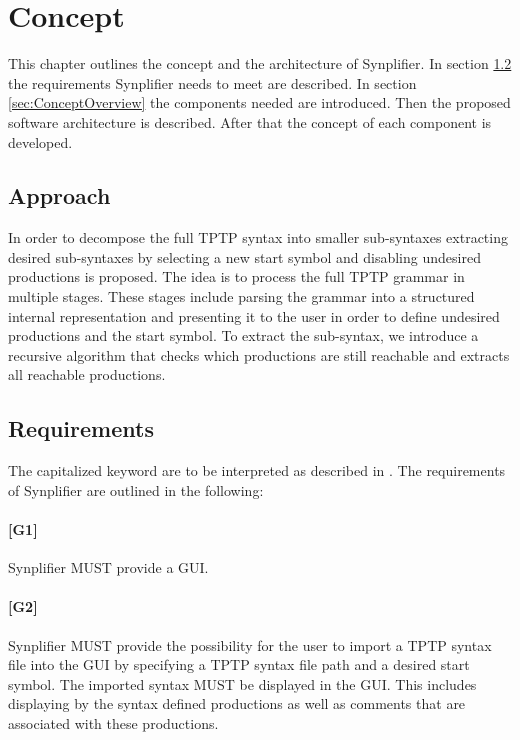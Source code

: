 
\chapter{Concept}\label{cha:Concept}
This chapter outlines the concept and the architecture of \ac{Synplifier}.
In section \ref{sec:ConceptRequirements} the requirements \ac{Synplifier} needs to meet are described.
In section \ref{sec:ConceptOverview} the components needed are introduced.
Then the proposed software architecture is described. After that the concept of each component is developed.

\section{Approach}\label{sec:ConceptApproach}

In order to decompose the full \ac{TPTP} syntax into smaller sub-syntaxes extracting desired sub-syntaxes by selecting a new start symbol and disabling undesired productions is proposed.
The idea is to process the full \ac{TPTP} grammar in multiple stages.
These stages include parsing the grammar into a structured internal representation and presenting it to the user in order to define undesired productions and the start symbol. To extract the sub-syntax, we introduce a recursive algorithm that checks which productions are still reachable and extracts all reachable
productions.

\section{Requirements}\label{sec:ConceptRequirements}

The capitalized keyword are to be interpreted as described in \cite{Bradner.1997}.
The requirements of \ac{Synplifier} are outlined in the following:\\
\subsubsection{[G1]}\label{G1}
\ac{Synplifier} MUST provide a GUI.
\subsubsection{[G2]}\label{G2}
\ac{Synplifier} MUST provide the possibility for the user to import a \ac{TPTP} syntax file into the GUI by specifying a \ac{TPTP} syntax file path and a desired start symbol. The imported syntax MUST be displayed in the GUI. This includes displaying by the syntax defined productions as well as comments that are associated with these productions.
